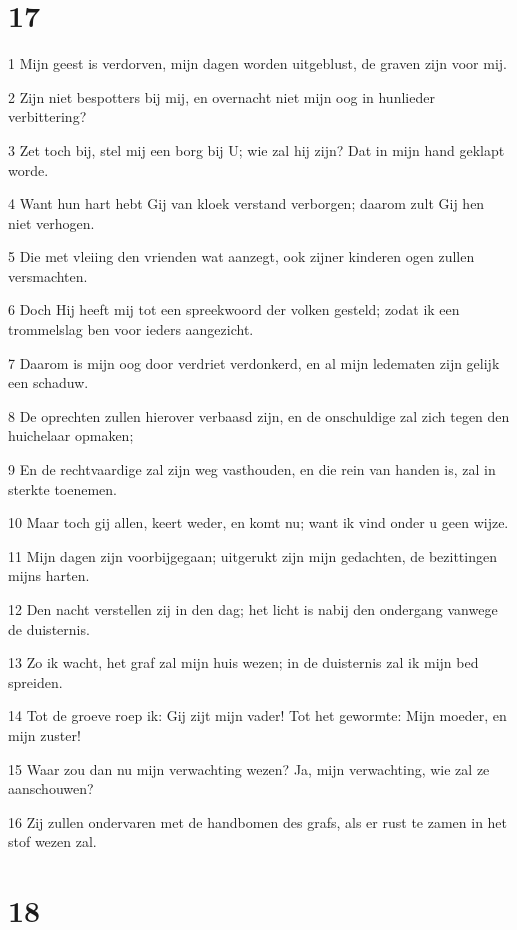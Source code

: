 \chapter{17}

\par 1 Mijn geest is verdorven, mijn dagen worden uitgeblust, de graven zijn voor mij.
\par 2 Zijn niet bespotters bij mij, en overnacht niet mijn oog in hunlieder verbittering?
\par 3 Zet toch bij, stel mij een borg bij U; wie zal hij zijn? Dat in mijn hand geklapt worde.
\par 4 Want hun hart hebt Gij van kloek verstand verborgen; daarom zult Gij hen niet verhogen.
\par 5 Die met vleiing den vrienden wat aanzegt, ook zijner kinderen ogen zullen versmachten.
\par 6 Doch Hij heeft mij tot een spreekwoord der volken gesteld; zodat ik een trommelslag ben voor ieders aangezicht.
\par 7 Daarom is mijn oog door verdriet verdonkerd, en al mijn ledematen zijn gelijk een schaduw.
\par 8 De oprechten zullen hierover verbaasd zijn, en de onschuldige zal zich tegen den huichelaar opmaken;
\par 9 En de rechtvaardige zal zijn weg vasthouden, en die rein van handen is, zal in sterkte toenemen.
\par 10 Maar toch gij allen, keert weder, en komt nu; want ik vind onder u geen wijze.
\par 11 Mijn dagen zijn voorbijgegaan; uitgerukt zijn mijn gedachten, de bezittingen mijns harten.
\par 12 Den nacht verstellen zij in den dag; het licht is nabij den ondergang vanwege de duisternis.
\par 13 Zo ik wacht, het graf zal mijn huis wezen; in de duisternis zal ik mijn bed spreiden.
\par 14 Tot de groeve roep ik: Gij zijt mijn vader! Tot het gewormte: Mijn moeder, en mijn zuster!
\par 15 Waar zou dan nu mijn verwachting wezen? Ja, mijn verwachting, wie zal ze aanschouwen?
\par 16 Zij zullen ondervaren met de handbomen des grafs, als er rust te zamen in het stof wezen zal.

\chapter{18}

